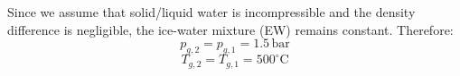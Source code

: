 Since we assume that solid/liquid water is incompressible and the density difference is negligible, the ice-water mixture (EW) remains constant. Therefore:  
\[ p_{g,2} = p_{g,1} = 1.5 \, \text{bar} \]  
\[ T_{g,2} = T_{g,1} = 500^\circ \text{C} \]